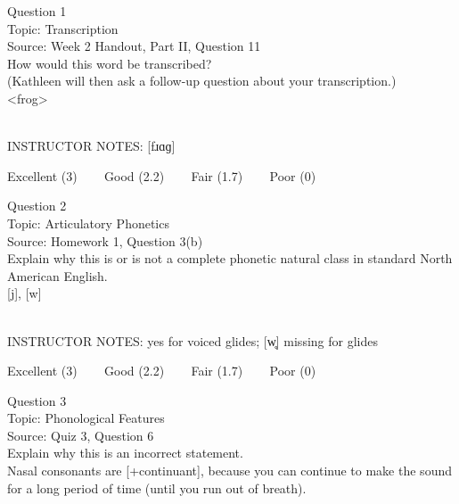 \documentclass[12pt]{article}
\begin{document}
\begin{center}
\textbf{{\color{blue}{\HUGE START OF EXAM\\}}}

\textbf{{\color{blue}{\HUGE Student ID: 89289\\}}}

\textbf{{\color{blue}{\HUGE \\}}}

\end{center}
\newpage

{\large Question 1}\\

Topic: Transcription\\
Source: Week 2 Handout, Part II, Question 11\\

How would this word be transcribed?\\ (Kathleen will then ask a follow-up question about your transcription.)\\

<frog>


~\\
INSTRUCTOR NOTES: [fɹɑɡ]


\vfill
Excellent (3) ~~~ Good (2.2) ~~~ Fair (1.7) ~~~ Poor (0)
\newpage

{\large Question 2}\\

Topic: Articulatory Phonetics\\
Source: Homework 1, Question 3(b)\\

Explain why this is or is not a complete phonetic natural class in standard North American English.\\

{[j]}, {[w]}


~\\
INSTRUCTOR NOTES: yes for voiced glides; [w̥] missing for glides


\vfill
Excellent (3) ~~~ Good (2.2) ~~~ Fair (1.7) ~~~ Poor (0)
\newpage

{\large Question 3}\\

Topic: Phonological Features\\
Source: Quiz 3, Question 6\\

Explain why this is an incorrect statement.\\

Nasal consonants are {[+continuant]}, because you can continue to make the sound for a long period of time (until you run out of breath).
\end{document}
